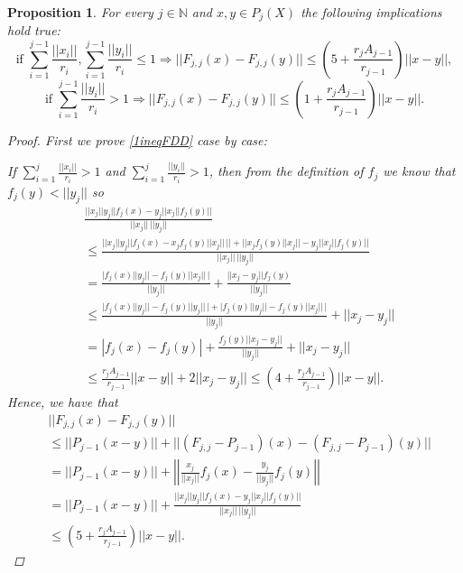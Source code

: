 \documentclass[11pt]{amsart}
\newcommand{\N}{\mathbb{N}}
\newcommand{\<}{\langle}
\renewcommand{\>}{\rangle}
\newtheorem{prop}[theorem]{Proposition}
\theoremstyle{definition}
\theoremstyle{remark}
\numberwithin{equation}{section}
\begin{document}
\begin{prop}\label{proplip2}
For every $j\in\N$ and $x,y\in P_j(X)$ the following implications hold true:
\begin{equation}\label{1ineqFDD}\text{if }\sum\limits_{i=1}^{j-1}\frac{||x_i||}{r_i},\sum\limits_{i=1}^{j-1}\frac{||y_i||}{r_i}\le1\Rightarrow||F_{j,j}(x)-F_{j,j}(y)||\le \left( 5+\frac{r_jA_{j-1}}{r_{j-1}} \right)||x-y||,\end{equation}
\begin{equation}\label{2ineqFDD}\text{if }\sum\limits_{i=1}^{j-1}\frac{||y_i||}{r_i}>1\Rightarrow||F_{j,j}(x)-F_{j,j}(y)||\le \left( 1+\frac{r_jA_{j-1}}{r_{j-1}} \right)||x-y||.\end{equation}
\begin{proof}
First we prove \eqref{1ineqFDD} case by case:

If $\sum\limits_{i=1}^{j}\frac{||x_i||}{r_i}>1$ and $\sum\limits_{i=1}^{j}\frac{||y_i||}{r_i}>1$, then from the definition of $f_j$ we know that $f_j(y)<||y_j||$ so
$$\begin{aligned}&\frac{\big|\big|x_j||y_j||f_j(x)-y_j||x_j||f_j(y) \big|\big|}{||x_j||\,||y_j||}\\
&\le\frac{\big|\big|x_j||y_j||f_j(x)-x_jf_j(y)||x_j||\,\big|\big|+\big|\big|x_jf_j(y)||x_j||-y_j||x_j||f_j(y) \big|\big|}{||x_j||\,||y_j||}\\
&=\frac{\big|f_j(x)||y_j||-f_j(y)||x_j||\,\big|}{||y_j||}+\frac{||x_j-y_j||f_j(y)}{||y_j||}\\
&\le\frac{\big|f_j(x)||y_j||-f_j(y)||y_j||\,\big|+\big|f_j(y)||y_j||-f_j(y)||x_j||\,\big|}{||y_j||}+||x_j-y_j||\\
&=|f_j(x)-f_j(y)|+\frac{f_j(y)||x_j-y_j||}{||y_j||}+||x_j-y_j||\\
&\le \frac{r_jA_{j-1}}{r_{j-1}}||x-y||+2||x_j-y_j||\le\left(4+\frac{r_jA_{j-1}}{r_{j-1}}\right)||x-y||.\end{aligned}$$
Hence, we have that
$$\begin{aligned} &||F_{j,j}(x)-F_{j,j}(y)||\\
&\le ||P_{j-1}(x-y)||+||(F_{j,j}-P_{j-1})(x)-(F_{j,j}-P_{j-1})(y)||\\
&=||P_{j-1}(x-y)||+\left|\left| \frac{x_j}{||x_j||}f_j(x)-\frac{y_j}{||y_j||}f_j(y) \right|\right|\\
&=||P_{j-1}(x-y)||+\frac{\big|\big|x_j||y_j||f_j(x)-y_j||x_j||f_j(y) \big|\big|}{||x_j||\,||y_j||}\\
&\le \left(5+\frac{r_jA_{j-1}}{r_{j-1}}\right)||x-y||. \end{aligned}$$


\end{proof}
\end{prop}
\end{document}
